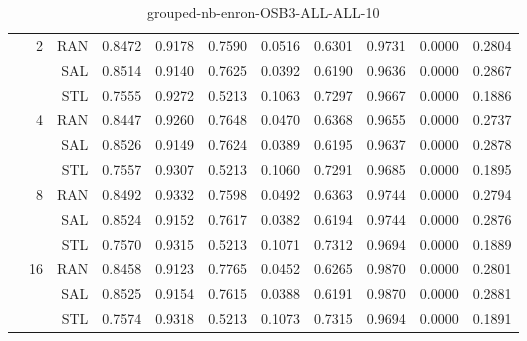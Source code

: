 \begin{center}
\begin{table}[htbp]
\begin{tabular}{ | r | r | r | r | r | r | r | r | r | r | r |}
 & \multirow{3}{*}{2} & RAN & 0.8472 & 0.9178 & 0.7590 & 0.0516 & 0.6301 & 0.9731 & 0.0000 & 0.2804\\ \cline{3-11}
 &   & SAL & 0.8514 & 0.9140 & 0.7625 & 0.0392 & 0.6190 & 0.9636 & 0.0000 & 0.2867\\ \cline{3-11}
 &   & STL & 0.7555 & 0.9272 & 0.5213 & 0.1063 & 0.7297 & 0.9667 & 0.0000 & 0.1886\\ \cline{2-11}
 & \multirow{3}{*}{4} & RAN & 0.8447 & 0.9260 & 0.7648 & 0.0470 & 0.6368 & 0.9655 & 0.0000 & 0.2737\\ \cline{3-11}
 &   & SAL & 0.8526 & 0.9149 & 0.7624 & 0.0389 & 0.6195 & 0.9637 & 0.0000 & 0.2878\\ \cline{3-11}
 &   & STL & 0.7557 & 0.9307 & 0.5213 & 0.1060 & 0.7291 & 0.9685 & 0.0000 & 0.1895\\ \cline{2-11}
 & \multirow{3}{*}{8} & RAN & 0.8492 & 0.9332 & 0.7598 & 0.0492 & 0.6363 & 0.9744 & 0.0000 & 0.2794\\ \cline{3-11}
 &   & SAL & 0.8524 & 0.9152 & 0.7617 & 0.0382 & 0.6194 & 0.9744 & 0.0000 & 0.2876\\ \cline{3-11}
 &   & STL & 0.7570 & 0.9315 & 0.5213 & 0.1071 & 0.7312 & 0.9694 & 0.0000 & 0.1889\\ \cline{2-11}
 & \multirow{3}{*}{16} & RAN & 0.8458 & 0.9123 & 0.7765 & 0.0452 & 0.6265 & 0.9870 & 0.0000 & 0.2801\\ \cline{3-11}
 &   & SAL & 0.8525 & 0.9154 & 0.7615 & 0.0388 & 0.6191 & 0.9870 & 0.0000 & 0.2881\\ \cline{3-11}
 &   & STL & 0.7574 & 0.9318 & 0.5213 & 0.1073 & 0.7315 & 0.9694 & 0.0000 & 0.1891\\ \cline{2-11}
\hline
\end{tabular}
\caption{grouped-nb-enron-OSB3-ALL-ALL-10}
\end{table}
\end{center}

